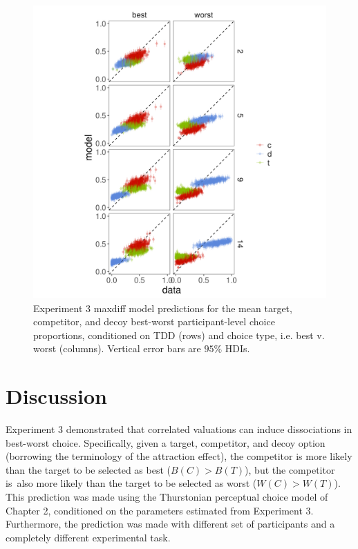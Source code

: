 \begin{figure}
   \includegraphics[width=\linewidth]{figures/maxdiff_1_subjectmeans_model_v_data.jpeg}
   \caption{Experiment 3 maxdiff model predictions for the mean target, competitor, and decoy best-worst participant-level choice proportions, conditioned on TDD (rows) and choice type, i.e. best v. worst (columns). Vertical error bars are $95\%$ HDIs.}
   \label{fig:maxdiff_sub_preds}
\end{figure}

\section{Discussion}
Experiment 3 demonstrated that correlated valuations can induce dissociations in best-worst choice. Specifically, given a target, competitor, and decoy option (borrowing the terminology of the attraction effect), the competitor is more likely than the target to be selected as best ($B(C)>B(T)$), but the competitor is\ also more likely than the target to be selected as worst ($W(C)>W(T)$). This prediction was made using the Thurstonian perceptual choice model of Chapter 2, conditioned on the parameters estimated from Experiment 3. Furthermore, the prediction was made with different set of participants and a completely different experimental task. 

